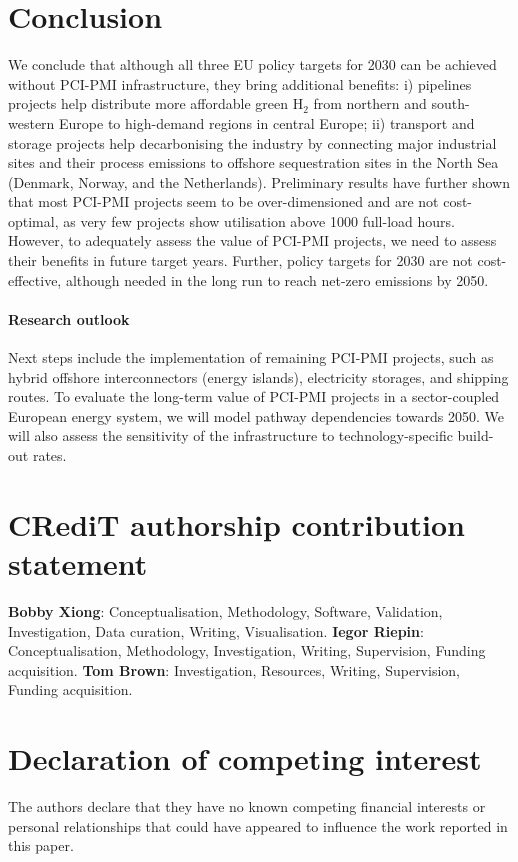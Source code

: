 \documentclass[preprint,12pt]{elsarticle}
\begin{document}
\section{Conclusion}
\label{sec:conclusion}
We conclude that although all three EU policy targets for 2030 can be achieved without PCI-PMI infrastructure, they bring additional benefits: i)  pipelines projects help distribute more affordable green H$_2$ from northern and south-western Europe to high-demand regions in central Europe; ii)  transport and storage projects help decarbonising the industry by connecting major industrial sites and their process emissions to offshore sequestration sites in the North Sea (Denmark, Norway, and the Netherlands). Preliminary results have further shown that most PCI-PMI projects seem to be over-dimensioned and are not cost-optimal, as very few projects show utilisation above 1000 full-load hours. However, to adequately assess the value of PCI-PMI projects, we need to assess their benefits in future target years. Further, policy targets for 2030 are not cost-effective, although needed in the long run to reach net-zero emissions by 2050.

\paragraph{Research outlook} Next steps include the implementation of remaining PCI-PMI projects, such as hybrid offshore interconnectors (energy islands), electricity storages, and  shipping routes. To evaluate the long-term value of PCI-PMI projects in a sector-coupled European energy system, we will model pathway dependencies towards 2050. We will also assess the sensitivity of the infrastructure to technology-specific build-out rates.


\newpage
\section*{CRediT authorship contribution statement}
\textbf{Bobby Xiong}: Conceptualisation, Methodology, Software, Validation, Investigation, Data curation, Writing, Visualisation. \textbf{Iegor Riepin}: Conceptualisation, Methodology, Investigation, Writing, Supervision, Funding acquisition. \textbf{Tom Brown}: Investigation, Resources, Writing, Supervision, Funding acquisition.

\section*{Declaration of competing interest}
The authors declare that they have no known competing financial interests or personal relationships that could have appeared to influence the work reported in this paper.
\end{document}
